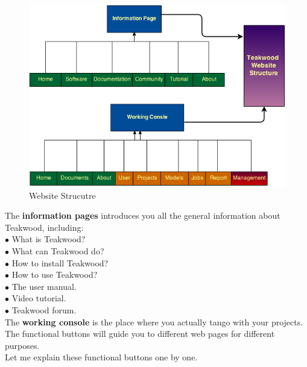 \begin{figure}[htb]
\centering
\includegraphics[scale=0.6]{./website_structure} %
\caption{Website Strucutre}
\label{fig:label} %
\end{figure}

The \textbf{information pages} introduces you all the general information about Teakwood, including:\\

$\bullet$ What is Teakwood?\\
$\bullet$ What can Teakwood do?\\
$\bullet$ How to install Teakwood?\\
$\bullet$ How to use Teakwood?\\
$\bullet$ The user manual.\\
$\bullet$ Video tutorial.\\
$\bullet$ Teakwood forum.\\



The \textbf{working console} is the place where you actually tango with your projects. The functional buttons will guide you to different web pages for different purposes.\\
Let me explain these functional buttons one by one.\\

